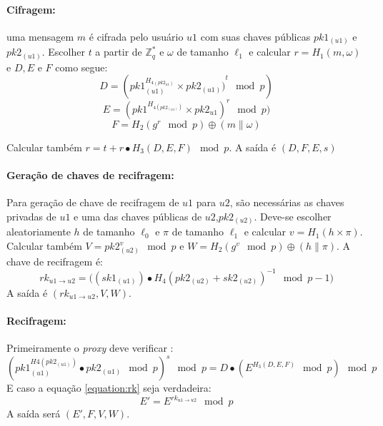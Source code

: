 \paragraph{Cifragem:} uma mensagem $m$ é cifrada pelo usuário $u1$
com suas chaves públicas $pk1_{(u1)}$ e $pk2_{(u1)}$. Escolher $t$ a partir de $\mathbb{Z}^*_q$ e $\omega$ de tamanho $\ell_1$ e calcular $r = H_1(m,\omega)$ e $D,E$ e $F$ como segue:
\begin{equation}
    D = ({{pk1^{H_{4(pk2_{u1})}}_{(u1)}} \times pk2_{(u1)})}^t \mod{p} )
\end{equation}
\begin{equation}
    E = ({pk1^{H_{4(pk2_{(u1)})}} \times pk2_{u1} })^r\mod{p})
\end{equation}
\begin{equation}
    F = H_2(g^r\mod{p})\oplus(m\parallel \omega) 
\end{equation}

Calcular também $ r = t+r\bullet H_3(D,E,F)\mod{p}$. A saída é $(D,F,E,s)$
\paragraph{Geração de chaves de recifragem:} Para geração de chave de recifragem de $u1$ para $u2$, são necessárias as chaves privadas de $u1$ e uma das chaves públicas de $u2$,$pk2_{(u2)}$. Deve-se escolher aleatoriamente $h$ de tamanho $\ell_0$ e $\pi$ de tamanho $\ell_1$ e calcular $v = H_1(h \times \pi)$. Calcular também $V = pk2^v_{(u2)} \mod{p}$ e $W = H_2(g^v\mod{p})\oplus(h \parallel \pi)$.
A chave de recifragem é:
\begin{equation}
    rk_{u1\rightarrow u2} = \big( {(sk1_{(u1)}) \bullet H_4(pk2_{(u2)} + sk2_{(u2)})}^{-1} \mod{p-1}  \big)
\end{equation}
A saída é $(rk_{u1\rightarrow u2},V,W)$.

\paragraph{Recifragem:}
Primeiramente o \emph{proxy} deve verificar :
\begin{equation}
\label{equation:rk}
    {(pk1^{H4(pk2_{(u1)})}_{(u1)} \bullet {pk2_{(u1)}\mod{p}})}^s \mod{p} = D \bullet (E^{H_3(D,E,F)} \mod{p} )\mod{p}
\end{equation}
E caso a equação \ref{equation:rk} seja verdadeira:
\begin{equation}
\label{equation:eu-pre:recifragem}
    E' = E^{rk_{u1\rightarrow u2}} \mod{p}
\end{equation}
A saída será $(E',F,V,W)$.
